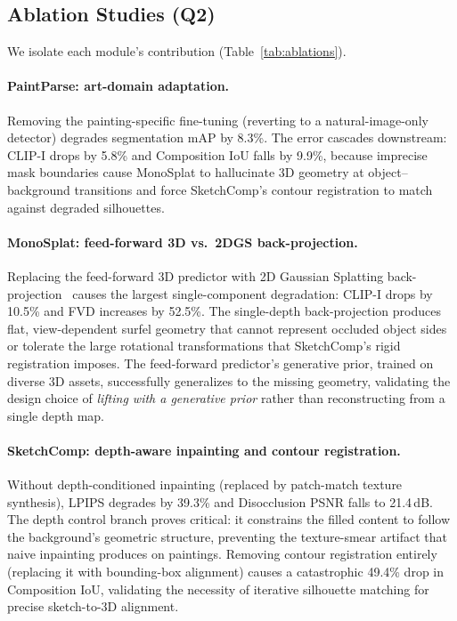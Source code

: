 \subsection{Ablation Studies (Q2)}

We isolate each module's contribution (Table~\ref{tab:ablations}).

\paragraph{PaintParse: art-domain adaptation.}
Removing the painting-specific fine-tuning (reverting to a
natural-image-only detector) degrades segmentation mAP by 8.3\%. The
error cascades downstream: CLIP-I drops by 5.8\% and Composition IoU
falls by 9.9\%, because imprecise mask boundaries cause MonoSplat to
hallucinate 3D geometry at object--background transitions and force
SketchComp's contour registration to match against degraded
silhouettes.

\paragraph{MonoSplat: feed-forward 3D vs.\ 2DGS back-projection.}
Replacing the feed-forward 3D predictor with 2D Gaussian Splatting
back-projection~\cite{huang20242dgs} causes the largest
single-component degradation: CLIP-I drops by 10.5\% and FVD increases
by 52.5\%. The single-depth back-projection produces flat,
view-dependent surfel geometry that cannot represent occluded object
sides or tolerate the large rotational transformations that
SketchComp's rigid registration imposes. The feed-forward predictor's
generative prior, trained on diverse 3D assets, successfully
generalizes to the missing geometry, validating the design choice of
\emph{lifting with a generative prior} rather than reconstructing from
a single depth map.

\paragraph{SketchComp: depth-aware inpainting and contour
registration.}
Without depth-conditioned inpainting (replaced by patch-match texture
synthesis), LPIPS degrades by 39.3\% and Disocclusion PSNR falls to
21.4\,dB. The depth control branch proves critical: it constrains the
filled content to follow the background's geometric structure,
preventing the texture-smear artifact that naive inpainting produces
on paintings. Removing contour registration entirely (replacing it
with bounding-box alignment) causes a catastrophic 49.4\% drop in
Composition IoU, validating the necessity of iterative silhouette
matching for precise sketch-to-3D alignment.

